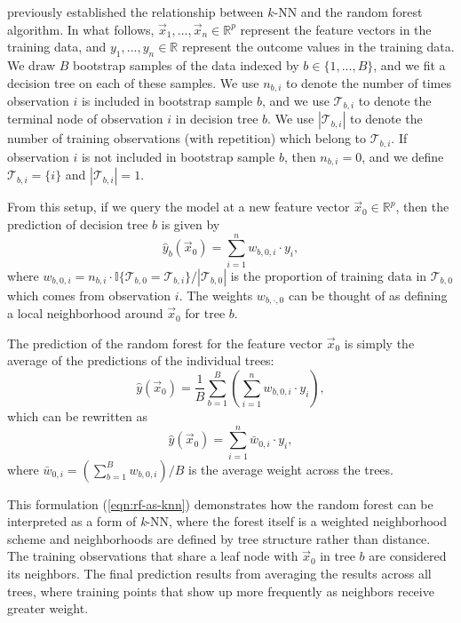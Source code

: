 \documentclass{article}
\begin{document}
\citet{lin_random_2006} previously established the relationship between $k$-NN and the random forest algorithm. In what follows, $\vec x_1, ..., \vec x_n \in \mathbb{R}^p$ represent the feature vectors in the training data, and $y_1, ..., y_n \in \mathbb{R}$ represent the outcome values in the training data. We draw $B$ bootstrap samples of the data indexed by $b \in \{1, ..., B\}$, and we fit a decision tree on each of these samples. We use $n_{b,i}$ to denote the number of times observation $i$ is included in bootstrap sample $b$, and we use $\mathcal{T}_{b,i}$ to denote the terminal node of observation $i$ in decision tree $b$. We use $|\mathcal{T}_{b,i}|$ to denote the number of training observations (with repetition) which belong to $\mathcal{T}_{b,i}$. If observation $i$ is not included in bootstrap sample $b$, then $n_{b,i} = 0$, and we define $\mathcal{T}_{b,i} = \{i\}$ and $|\mathcal{T}_{b,i}| = 1$.

From this setup, if we query the model at a new feature vector $\vec x_0 \in \mathbb{R}^p$, then the prediction of decision tree $b$ is given by
$$
  \hat{y}_b(\vec x_0) = \sum_{i = 1}^{n} w_{b,0,i} \cdot y_i,
$$
where $w_{b,0,i} = n_{b,i} \cdot \mathbb{I}\{\mathcal{T}_{b,0} = \mathcal{T}_{b,i}\} / |\mathcal{T}_{b,0}|$ is the proportion of training data in $\mathcal{T}_{b,0}$ which comes from observation $i$. The weights $w_{b,\cdot,0}$ can be thought of as defining a local neighborhood around $\vec x_0$ for tree $b$.

The prediction of the random forest for the feature vector $\vec x_0$ is simply the average of the predictions of the individual trees:
\begin{equation*}
  \hat{y}(\vec x_0) = \frac{1}{B} \sum_{b = 1}^B \left(\sum_{i = 1}^{n} w_{b,0,i} \cdot y_i\right),
\end{equation*}
which can be rewritten as
\begin{equation}
  \label{eqn:rf-as-knn}
  \hat{y}(\vec x_0) = \sum_{i = 1}^n \bar w_{0,i} \cdot y_i,
\end{equation}
where $\bar w_{0,i} = \left(\sum_{b = 1}^B w_{b,0,i}\right) / B$ is the average weight across the trees.

This formulation (\ref{eqn:rf-as-knn}) demonstrates how the random forest can be interpreted as a form of \textit{k}-NN, where the forest itself is a weighted neighborhood scheme and neighborhoods are defined by tree structure rather than distance. The training observations that share a leaf node with $\vec x_0$ in tree $b$ are considered its neighbors. The final prediction results from averaging the results across all trees, where training points that show up more frequently as neighbors receive greater weight.
\end{document}

